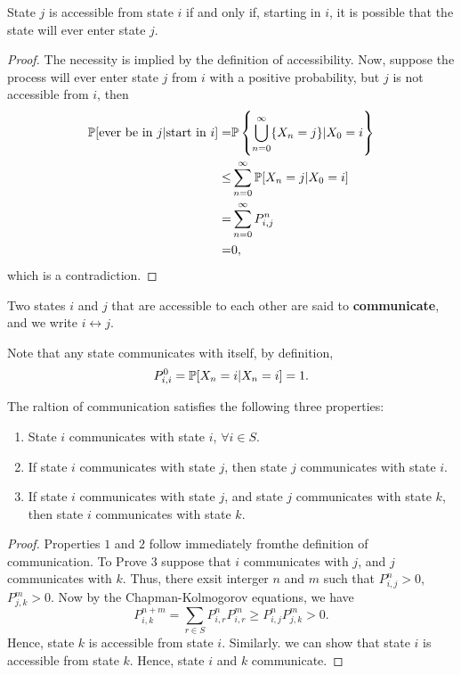 \begin{theorem}
    State $j$ is accessible from state $i$ if and only if, starting in $i$, it is possible that the state will ever enter state $j$. 
    \begin{proof}
        The necessity is implied by the definition of accessibility. Now, suppose the process will ever enter state $j$ from $i$ with a positive probability, but $j$ is not accessible from $i$, then 
        \begin{align*}
            \mathbb{P} [\text{ever be in } j | \text{start in } i] = & \mathbb{P} \left\{ \bigcup_{n=0}^\infty \{X_n = j\} | X_0 = i \right\} \\ 
            \le & \sum_{n = 0}^\infty \mathbb{P} [X_n = j | X_0 = i] \\ 
            = & \sum_{n = 0}^\infty P_{i,j}^n \\ 
            = & 0,
        \end{align*}
        which is a contradiction.
    \end{proof}
\end{theorem}

\begin{definition}[Communication]
    Two states $i$ and $j$ that are accessible to each other are said to \textbf{communicate}, and we write $i \leftrightarrow j$.
\end{definition}

\begin{remark}
    Note that any state communicates with itself, by definition, 
    $$P^0_{i, i} = \mathbb{P}[X_n = i | X_n = i] = 1.$$
\end{remark}

\begin{theorem}
    The raltion of communication satisfies the following three properties: 
    \begin{enumerate}
        \item State $i$ communicates with state $i$, $\forall i \in S$.
        \item If state $i$ communicates with state $j$, then state $j$ communicates with state $i$.
        \item If state $i$ communicates with state $j$, and state $j$ communicates with state $k$, then state $i$ communicates with state $k$.
    \end{enumerate}
    \begin{proof}
        Properties $1$ and $2$ follow immediately fromthe definition of communication. To Prove $3$ suppose that $i$ communicates with $j$, and $j$ communicates with $k$. Thus, there exsit interger $n$ and $m$ such that $P^n_{i,j} > 0$, $P^m_{j, k} > 0$. Now by the Chapman-Kolmogorov equations, we have 
        $$
        P^{n+m}_{i, k} = \sum_{r \in S} P^n_{i,r}P^m_{i,r} \ge P^n_{i,j}P^m_{j,k} > 0.
        $$
        Hence, state $k$ is accessible from state $i$. Similarly. we can show that state $i$ is accessible from state $k$. Hence, state $i$ and $k$ communicate.
    \end{proof}
\end{theorem}

